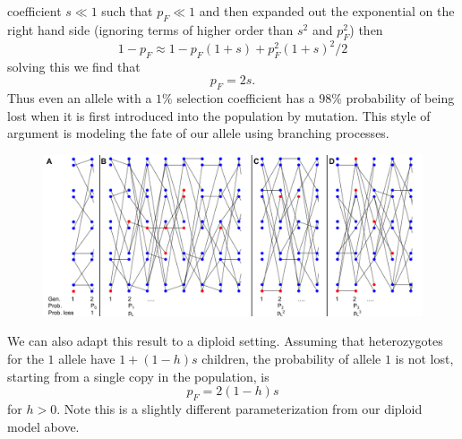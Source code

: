 coefficient $s \ll 1$ such that $p_F \ll 1$ and then expanded out the
exponential on the right hand side (ignoring terms of higher
order than $s^2$ and $p_F^2$) then
\begin{equation}
1-p_F \approx 1-p_F(1+s)+p_F^2(1+s)^2/2
\end{equation}
solving this we find that
\begin{equation}
p_F = 2s.
\end{equation}
Thus even an allele with a $1\%$ selection coefficient has a $98\%$
probability of being lost when it is first introduced into the
population by mutation. This style of argument is modeling the fate of
our allele using branching processes.\\

\begin{figure}
\begin{center}
\includegraphics[width=\textwidth]{figures/Proof_of_pL_2s.png}
\end{center}
\caption{} \label{fig:Proof_of_pL_2s}
\end{figure}

We can also adapt this result to a diploid setting.
Assuming that heterozygotes for the $1$ allele have $1+(1-h)s$ children, the
probability of allele $1$ is not lost, starting from a single copy in
the population, is
\begin{equation}
p_F = 2 (1-h)s \label{eqn:diploid_escape}
\end{equation}
for $h>0$. Note this is a slightly different parameterization from
our diploid model above.\\


